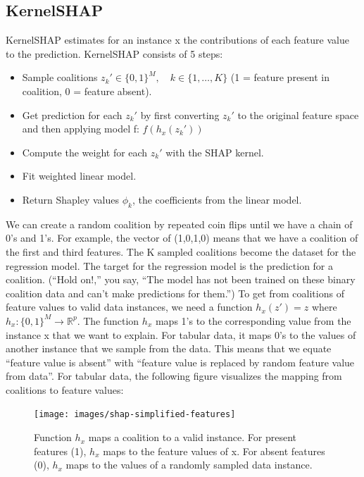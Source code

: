 \documentclass[12pt,]{krantz}
\providecommand{\tightlist}{%
  \setlength{\itemsep}{0pt}\setlength{\parskip}{0pt}}
\begin{document}
\subsection{KernelSHAP}\label{kernelshap}

KernelSHAP estimates for an instance x the contributions of each feature
value to the prediction. KernelSHAP consists of 5 steps:

\begin{itemize}
\tightlist
\item
  Sample coalitions \(z_k'\in\{0,1\}^M,\quad{}k\in\{1,\ldots,K\}\) (1 =
  feature present in coalition, 0 = feature absent).
\item
  Get prediction for each \(z_k'\) by first converting \(z_k'\) to the
  original feature space and then applying model f: \(f(h_x(z_k'))\)
\item
  Compute the weight for each \(z_k'\) with the SHAP kernel.
\item
  Fit weighted linear model.
\item
  Return Shapley values \(\phi_k\), the coefficients from the linear
  model.
\end{itemize}

We can create a random coalition by repeated coin flips until we have a
chain of 0's and 1's. For example, the vector of (1,0,1,0) means that we
have a coalition of the first and third features. The K sampled
coalitions become the dataset for the regression model. The target for
the regression model is the prediction for a coalition. (``Hold on!,''
you say, ``The model has not been trained on these binary coalition data
and can't make predictions for them.'') To get from coalitions of
feature values to valid data instances, we need a function \(h_x(z')=z\)
where \(h_x:\{0,1\}^M\rightarrow\mathbb{R}^p\). The function \(h_x\)
maps 1's to the corresponding value from the instance x that we want to
explain. For tabular data, it maps 0's to the values of another instance
that we sample from the data. This means that we equate ``feature value
is absent'' with ``feature value is replaced by random feature value
from data''. For tabular data, the following figure visualizes the
mapping from coalitions to feature values:

\begin{figure}

{\centering \texttt{[image: images/shap-simplified-features]} 

}

\caption{Function $h_x$ maps a coalition to a valid instance. For present features (1), $h_x$ maps to the feature values of x. For absent features (0), $h_x$ maps to the values of a randomly sampled data instance.}\label{fig:shap-simplified-feature}
\end{figure}
\end{document}
